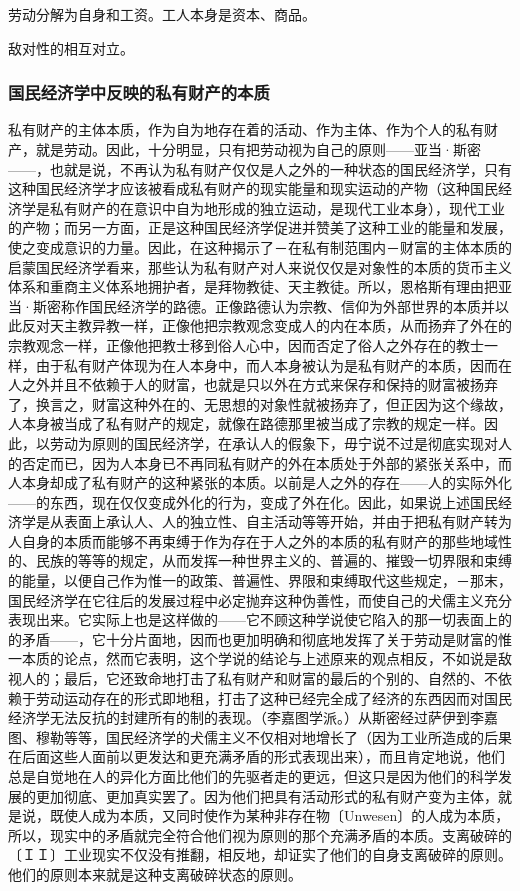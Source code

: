 \documentclass[a4paper,twoside,12pt]{ctexart}
\begin{document}
劳动分解为自身和工资。工人本身是资本、商品。

敌对性的相互对立。

\subsubsection{国民经济学中反映的私有财产的本质}
私有财产的主体本质，作为自为地存在着的活动、作为主体、作为个人的私有财产，就是劳动。因此，十分明显，只有把劳动视为自己的原则——亚当·斯密——，也就是说，不再认为私有财产仅仅是人之外的一种状态的国民经济学，只有这种国民经济学才应该被看成私有财产的现实能量和现实运动的产物（这种国民经济学是私有财产的在意识中自为地形成的独立运动，是现代工业本身），现代工业的产物；而另一方面，正是这种国民经济学促进并赞美了这种工业的能量和发展，使之变成意识的力量。因此，在这种揭示了－在私有制范围内－财富的主体本质的启蒙国民经济学看来，那些认为私有财产对人来说仅仅是对象性的本质的货币主义体系和重商主义体系地拥护者，是拜物教徒、天主教徒。所以，恩格斯有理由把亚当·斯密称作国民经济学的路德。正像路德认为宗教、信仰为外部世界的本质并以此反对天主教异教一样，正像他把宗教观念变成人的内在本质，从而扬弃了外在的宗教观念一样，正像他把教士移到俗人心中，因而否定了俗人之外存在的教士一样，由于私有财产体现为在人本身中，而人本身被认为是私有财产的本质，因而在人之外并且不依赖于人的财富，也就是只以外在方式来保存和保持的财富被扬弃了，换言之，财富这种外在的、无思想的对象性就被扬弃了，但正因为这个缘故，人本身被当成了私有财产的规定，就像在路德那里被当成了宗教的规定一样。因此，以劳动为原则的国民经济学，在承认人的假象下，毋宁说不过是彻底实现对人的否定而已，因为人本身已不再同私有财产的外在本质处于外部的紧张关系中，而人本身却成了私有财产的这种紧张的本质。以前是人之外的存在——人的实际外化——的东西，现在仅仅变成外化的行为，变成了外在化。因此，如果说上述国民经济学是从表面上承认人、人的独立性、自主活动等等开始，并由于把私有财产转为人自身的本质而能够不再束缚于作为存在于人之外的本质的私有财产的那些地域性的、民族的等等的规定，从而发挥一种世界主义的、普遍的、摧毁一切界限和束缚的能量，以便自己作为惟一的政策、普遍性、界限和束缚取代这些规定，－那末，国民经济学在它往后的发展过程中必定抛弃这种伪善性，而使自己的犬儒主义充分表现出来。它实际上也是这样做的——它不顾这种学说使它陷入的那一切表面上的的矛盾——，它十分片面地，因而也更加明确和彻底地发挥了关于劳动是财富的惟一本质的论点，然而它表明，这个学说的结论与上述原来的观点相反，不如说是敌视人的；最后，它还致命地打击了私有财产和财富的最后的个别的、自然的、不依赖于劳动运动存在的形式即地租，打击了这种已经完全成了经济的东西因而对国民经济学无法反抗的封建所有的制的表现。（李嘉图学派。）从斯密经过萨伊到李嘉图、穆勒等等，国民经济学的犬儒主义不仅相对地增长了（因为工业所造成的后果在后面这些人面前以更发达和更充满矛盾的形式表现出来），而且肯定地说，他们总是自觉地在人的异化方面比他们的先驱者走的更远，但这只是因为他们的科学发展的更加彻底、更加真实罢了。因为他们把具有活动形式的私有财产变为主体，就是说，既使人成为本质，又同时使作为某种非存在物〔Unwesen〕的人成为本质，所以，现实中的矛盾就完全符合他们视为原则的那个充满矛盾的本质。支离破碎的〔ＩＩ〕工业现实不仅没有推翻，相反地，却证实了他们的自身支离破碎的原则。他们的原则本来就是这种支离破碎状态的原则。
\end{document}
